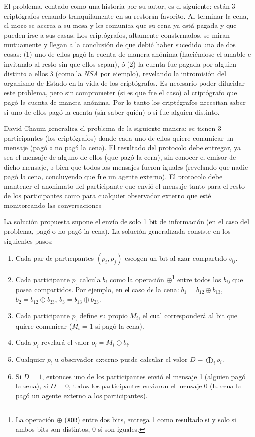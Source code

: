 El problema, contado como una historia por su autor, es el siguiente: están 3 criptógrafos cenando tranquilamente en su restorán favorito. 
Al terminar la cena, el mozo 
se acerca a su mesa y les comunica que su cena ya está pagada y que pueden irse a sus casas. Los criptógrafos, altamente consternados, 
se miran mutuamente y llegan a la conclusión de que debió haber sucedido una de dos cosas: (1) uno de ellos pagó la cuenta de manera 
anónima (haciéndose el amable e invitando al resto sin que ellos sepan), ó (2) la cuenta fue pagada por alguien distinto a ellos 3 
(como la \emph{NSA} por ejemplo), revelando la intromisión del organismo de Estado en la vida de los criptógrafos. Es necesario poder 
dilucidar este problema, pero sin comprometer (si es que fue el caso) al criptógrafo que pagó la cuenta de manera anónima. Por lo tanto 
los criptógrafos necesitan saber si uno de ellos pagó la cuenta (sin saber quién) o si fue alguien distinto.

David Chaum generaliza el problema de la siguiente manera: se tienen 3 participantes (los criptógrafos) donde cada uno de ellos quiere 
comunicar un mensaje (pagó o no pagó la cena). El resultado del protocolo debe entregar, ya sea el mensaje de alguno de ellos 
(que pagó la cena), sin conocer el emisor de dicho mensaje, o bien que todos los mensajes fueron iguales (revelando que nadie pagó la cena, concluyendo 
que fue un agente externo). El protocolo debe mantener el anonimato del participante que envió el mensaje tanto para el resto de los 
participantes como para cualquier observador externo que esté monitoreando las conversaciones.

La solución propuesta supone el envío de solo 1 bit de información (en el caso del problema, pagó o no pagó la cena). 
La solución generalizada consiste en los siguientes pasos:
\begin{enumerate}
    \item Cada par de participantes $(p_i, p_j)$ escogen un bit al azar compartido $b_{ij}$.
    \item Cada participante $p_i$ calcula $b_i$ como la operación $\oplus$\footnote{La operación $\oplus$ (\texttt{XOR}) entre 
    dos bits, entrega 1 como resultado si y solo si ambos bits son distintos, 0 si son iguales.} entre todos los $b_{ij}$ que posea 
    compartidos. Por ejemplo, en el caso de la cena: $b_1 = b_{12} \oplus b_{13}$, $b_2 = b_{12} \oplus b_{23}$, $b_3 = b_{13} \oplus b_{23}$.
    \item Cada participante $p_i$ define su propio $M_i$, el cual corresponderá al bit que quiere comunicar ($M_i = 1$ si pagó la cena).
    \item Cada $p_i$ revelará el valor $o_i = M_i \oplus b_i$.
    \item Cualquier $p_i$ u observador externo puede calcular el valor $D = \displaystyle\bigoplus_i o_i$.
    \item Si $D = 1$, entonces uno de los participantes envió el mensaje 1 (alguien pagó la cena), si $D = 0$, todos los participantes 
    enviaron el mensaje 0 (la cena la pagó un agente externo a los participantes).
\end{enumerate}

